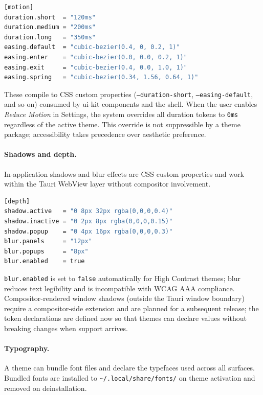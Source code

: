 \begin{lstlisting}[language=bash, caption={Motion token declaration}]
[motion]
duration.short  = "120ms"
duration.medium = "200ms"
duration.long   = "350ms"
easing.default  = "cubic-bezier(0.4, 0, 0.2, 1)"
easing.enter    = "cubic-bezier(0.0, 0.0, 0.2, 1)"
easing.exit     = "cubic-bezier(0.4, 0.0, 1.0, 1)"
easing.spring   = "cubic-bezier(0.34, 1.56, 0.64, 1)"
\end{lstlisting}

These compile to CSS custom properties (\texttt{--duration-short},
\texttt{--easing-default}, and so on) consumed by ui-kit components and the
shell. When the user enables \emph{Reduce Motion} in Settings, the system
overrides all duration tokens to \texttt{0ms} regardless of the active theme.
This override is not suppressible by a theme package; accessibility takes
precedence over aesthetic preference.

\paragraph{Shadows and depth.}
In-application shadows and blur effects are CSS custom properties and work
within the Tauri WebView layer without compositor involvement.

\begin{lstlisting}[language=bash, caption={Depth token declaration}]
[depth]
shadow.active   = "0 8px 32px rgba(0,0,0,0.4)"
shadow.inactive = "0 2px 8px rgba(0,0,0,0.15)"
shadow.popup    = "0 4px 16px rgba(0,0,0,0.3)"
blur.panels     = "12px"
blur.popups     = "8px"
blur.enabled    = true
\end{lstlisting}

\texttt{blur.enabled} is set to \texttt{false} automatically for High Contrast
themes; blur reduces text legibility and is incompatible with WCAG AAA
compliance. Compositor-rendered window shadows (outside the Tauri window
boundary) require a compositor-side extension and are planned for a subsequent
release; the token declarations are defined now so that themes can declare
values without breaking changes when support arrives.

\paragraph{Typography.}
A theme can bundle font files and declare the typefaces used across all
surfaces. Bundled fonts are installed to
\texttt{\textasciitilde/.local/share/fonts/} on theme activation and removed
on deinstallation.

